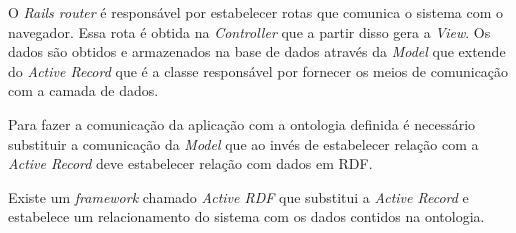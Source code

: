O \textit{Rails router} é responsável por estabelecer rotas que comunica o sistema com o navegador. Essa rota é obtida
na \textit{Controller} que a partir disso gera a \textit{View}. Os dados são obtidos e armazenados na base de dados através da \textit{Model}
que extende do \textit{Active Record} que é a classe responsável por fornecer os meios de comunicação com a camada de dados.

Para fazer a comunicação da aplicação com a ontologia definida é necessário substituir a comunicação da \textit{Model} que ao invés
de estabelecer relação com a \textit{Active Record} deve estabelecer relação com dados em RDF.

Existe um \textit{framework} chamado \textit{Active RDF} \footnotemark[1] que substitui a \textit{Active Record} e estabelece um relacionamento
do sistema com os dados contidos na ontologia. 

